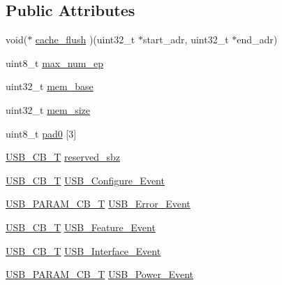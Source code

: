 \subsection*{Public Attributes}
\begin{DoxyCompactItemize}
\item 
void($\ast$ \hyperlink{structUSBD__API__INIT__PARAM_a7cba1a0917ee4ef1d8288db18f907bd4}{cache\+\_\+flush} )(uint32\+\_\+t $\ast$start\+\_\+adr, uint32\+\_\+t $\ast$end\+\_\+adr)
\item 
uint8\+\_\+t \hyperlink{structUSBD__API__INIT__PARAM_a168996cbd91b47939fe823bf0bf7cbe0}{max\+\_\+num\+\_\+ep}
\item 
uint32\+\_\+t \hyperlink{structUSBD__API__INIT__PARAM_ac3209246722c2395c476c82d0e76c879}{mem\+\_\+base}
\item 
uint32\+\_\+t \hyperlink{structUSBD__API__INIT__PARAM_a237d34b2303d35b80c7ebb9c58326bf9}{mem\+\_\+size}
\item 
uint8\+\_\+t \hyperlink{structUSBD__API__INIT__PARAM_ab537ed0a84e63aaf79592e8bd500c79c}{pad0} \mbox{[}3\mbox{]}
\item 
\hyperlink{group__USBD__Core_ga0404ce046312aa5c798cc4a05c417e46}{U\+S\+B\+\_\+\+C\+B\+\_\+T} \hyperlink{structUSBD__API__INIT__PARAM_a8470d3c0f29b31408ffa46dd4a4bd74a}{reserved\+\_\+sbz}
\item 
\hyperlink{group__USBD__Core_ga0404ce046312aa5c798cc4a05c417e46}{U\+S\+B\+\_\+\+C\+B\+\_\+T} \hyperlink{structUSBD__API__INIT__PARAM_ac78477c763bc96613ad5069c84ae3563}{U\+S\+B\+\_\+\+Configure\+\_\+\+Event}
\item 
\hyperlink{group__USBD__Core_ga7df622c61ebb152b83dd5972ac789b28}{U\+S\+B\+\_\+\+P\+A\+R\+A\+M\+\_\+\+C\+B\+\_\+T} \hyperlink{structUSBD__API__INIT__PARAM_aff13e98d564c8a0e2356e749a7f9b303}{U\+S\+B\+\_\+\+Error\+\_\+\+Event}
\item 
\hyperlink{group__USBD__Core_ga0404ce046312aa5c798cc4a05c417e46}{U\+S\+B\+\_\+\+C\+B\+\_\+T} \hyperlink{structUSBD__API__INIT__PARAM_a785b92610b9c3430e50123ffd8a0497b}{U\+S\+B\+\_\+\+Feature\+\_\+\+Event}
\item 
\hyperlink{group__USBD__Core_ga0404ce046312aa5c798cc4a05c417e46}{U\+S\+B\+\_\+\+C\+B\+\_\+T} \hyperlink{structUSBD__API__INIT__PARAM_a8582d6606f3154437b513800a6bff4c9}{U\+S\+B\+\_\+\+Interface\+\_\+\+Event}
\item 
\hyperlink{group__USBD__Core_ga7df622c61ebb152b83dd5972ac789b28}{U\+S\+B\+\_\+\+P\+A\+R\+A\+M\+\_\+\+C\+B\+\_\+T} \hyperlink{structUSBD__API__INIT__PARAM_af2aaf61b6e8ada6c2d50b61d516e2db6}{U\+S\+B\+\_\+\+Power\+\_\+\+Event}

\end{DoxyCompactItemize}
